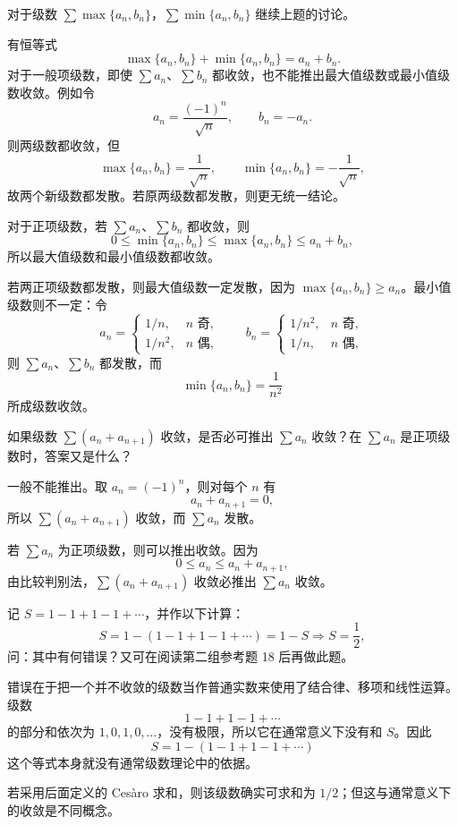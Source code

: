 \begin{xthought}[3]
对于级数 $\sum\max\{a_n,b_n\}$，$\sum\min\{a_n,b_n\}$ 继续上题的讨论。
\end{xthought}
\begin{xsolution}
有恒等式
\[
 \max\{a_n,b_n\}+\min\{a_n,b_n\}=a_n+b_n.
\]
对于一般项级数，即使 $\sum a_n$、$\sum b_n$ 都收敛，也不能推出最大值级数或最小值级数收敛。例如令
\[
 a_n=\frac{(-1)^n}{\sqrt n},\qquad b_n=-a_n.
\]
则两级数都收敛，但
\[
 \max\{a_n,b_n\}=\frac1{\sqrt n},\qquad
 \min\{a_n,b_n\}=-\frac1{\sqrt n},
\]
故两个新级数都发散。若原两级数都发散，则更无统一结论。

对于正项级数，若 $\sum a_n$、$\sum b_n$ 都收敛，则
\[
 0\leq\min\{a_n,b_n\}\leq\max\{a_n,b_n\}\leq a_n+b_n,
\]
所以最大值级数和最小值级数都收敛。

若两正项级数都发散，则最大值级数一定发散，因为 $\max\{a_n,b_n\}\geq a_n$。最小值级数则不一定：令
\[
 a_n=\begin{cases}1/n,&n\text{ 奇},\\1/n^2,&n\text{ 偶},\end{cases}
 \qquad
 b_n=\begin{cases}1/n^2,&n\text{ 奇},\\1/n,&n\text{ 偶},\end{cases}
\]
则 $\sum a_n$、$\sum b_n$ 都发散，而
\[
 \min\{a_n,b_n\}=\frac1{n^2}
\]
所成级数收敛。
\end{xsolution}


\begin{xthought}[4]
如果级数 $\sum(a_n+a_{n+1})$ 收敛，是否必可推出 $\sum a_n$ 收敛？在 $\sum a_n$ 是正项级数时，答案又是什么？
\end{xthought}
\begin{xsolution}
一般不能推出。取 $a_n=(-1)^n$，则对每个 $n$ 有
\[
 a_n+a_{n+1}=0,
\]
所以 $\sum(a_n+a_{n+1})$ 收敛，而 $\sum a_n$ 发散。

若 $\sum a_n$ 为正项级数，则可以推出收敛。因为
\[
 0\leq a_n\leq a_n+a_{n+1},
\]
由比较判别法，$\sum(a_n+a_{n+1})$ 收敛必推出 $\sum a_n$ 收敛。
\end{xsolution}


\begin{xthought}[5]
记 $S=1-1+1-1+\cdots$，并作以下计算：
\[
S=1-(1-1+1-1+\cdots)=1-S\Rightarrow S=\frac12,
\]
问：其中有何错误？又可在阅读第二组参考题 18 后再做此题。
\end{xthought}
\begin{xsolution}
错误在于把一个并不收敛的级数当作普通实数来使用了结合律、移项和线性运算。级数
\[
 1-1+1-1+\cdots
\]
的部分和依次为 $1,0,1,0,\ldots$，没有极限，所以它在通常意义下没有和 $S$。因此
\[
 S=1-(1-1+1-1+\cdots)
\]
这个等式本身就没有通常级数理论中的依据。

若采用后面定义的 Cesàro 求和，则该级数确实可求和为 $1/2$；但这与通常意义下的收敛是不同概念。
\end{xsolution}


